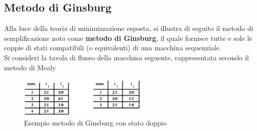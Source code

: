 \documentclass[a4paper]{extarticle}
\begin{document}
\vspace{1em}
\subsection{Metodo di Ginsburg}
Alla luce della teoria di minimizzazione esposta, si illustra di seguito il metodo di semplificazione noto come \textbf{metodo di Ginsburg}, il quale fornisce tutte e sole le coppie di stati compatibili (o equivalenti) di una macchina sequenziale.\\
Si consideri la tavola di flusso della macchina seguente, rappresentata secondo il metodo di Mealy

\begin{figure}[H]
    \centering
    \includegraphics[width=0.55\textwidth]{metodo-ginsburg-1.png}
    \caption{Esempio metodo di Ginsburg con stato doppio}
    \label{fig:metodo_ginsburg_1}
\end{figure}
\end{document}
